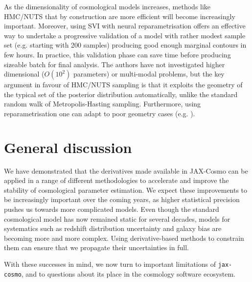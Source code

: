 \documentclass[twocolumn,twocolappendix,nofootinbib,iop]{openjournal}
\newcommand{\JZ}[1]{{\color{purple}JZ: #1}}
\newcommand{\resubnote}[1]{#1} %
\newcommand{\jaxcosmo}{\texttt{jax-cosmo}}
\begin{document}


As the dimensionality of cosmological models increases, methods like HMC/NUTS that by construction are more efficient will become increasingly important. Moreover, using SVI with neural reparametrisation offers an effective way to undertake a progressive validation of a model with rather modest sample set (e.g. starting with 200 samples) producing good enough marginal contours in few hours. In practice, this validation phase can save time before producing sizeable batch for final analysis. The authors have not investigated higher dimensional ($O(10^2)$ parameters) or multi-modal problems, but the key argument in favour of HMC/NUTS sampling is that it exploits the geometry of the typical set of the posterior distribution automatically, unlike the standard random walk of Metropolis-Hasting sampling. Furthermore, using reparametrisation  one can adapt to poor geometry cases (e.g. \citealp{2019arXiv190303704H}).
%

\section{General discussion}
\label{sec-discussion}
%
\resubnote{We have demonstrated that the derivatives made available in JAX-Cosmo can be applied in a range of different methodologies to accelerate and improve the stability of cosmological parameter estimation. We expect these improvements to be increasingly important over the coming years, as higher statistical precision pushes us towards more complicated models. Even though the standard cosmological model has now remained static for several decades, models for systematics such as redshift distribution uncertainty and galaxy bias are becoming more and more complex. Using derivative-based methods to constrain them can ensure that we propagate their uncertainties in full.}

\resubnote{With these successes in mind, we now turn to important limitations of \jaxcosmo, and to questions about its place in the cosmology software ecosystem.}
\end{document}
